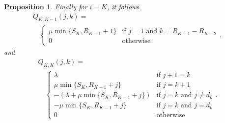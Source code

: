 \documentclass[conference]{IEEEtran}
\newtheorem{prosi}{Proposition}
\begin{document}
\begin{prosi}
% 

Finally for $i=K$, it follows
\begin{multline*}
Q_{K,K \!-\!1}(j,k) = \\
\quad 
\begin{cases}
\mu \min\{S_{K},R_{K \!-\!1} \!+\!1\}   & \! \mbox{if} \, \, j\!=\!1 \, \, \mbox{and} \, \,  k\!=\!R_{K \!-\!1}\!-\!R_{K\!-\!2}\\
0                                       & \! \mbox{otherwise}
\end{cases} ,
\end{multline*}
and 
\begin{multline*}
Q_{K,K}(j,k) = \\ 
\quad 
\begin{cases}
\lambda                                     & \mbox{if } j+1=k\\
\mu \min\{S_{K},R_{K\!-\!1}+j\}             & \mbox{if } j=k+1\\
-(\lambda+ \mu \min\{S_{K},R_{K-1}\!+\!j\}) & \mbox{if } j=k \mbox{ and } j \neq \! d_{k}\\
- \mu \min\{S_{K},R_{K-1}+j\}               & \mbox{if } j=k \mbox{ and } j= \! d_{k}\\
0                                           & \mbox{otherwise} 
\end{cases}.
\end{multline*}
       

\end{prosi}
\end{document}
